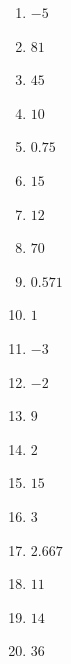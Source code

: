 \documentclass{article}
\begin{document}
\begin{enumerate}
\item $\displaystyle -5 $ \
\item $\displaystyle 81 $ \
\item $\displaystyle 45 $ \
\item $\displaystyle 10 $ \
\item $\displaystyle 0.75 $ \
\item $\displaystyle 15 $ \
\item $\displaystyle 12 $ \
\item $\displaystyle 70 $ \
\item $\displaystyle 0.571 $ \
\item $\displaystyle 1 $ \
\item $\displaystyle -3 $ \
\item $\displaystyle -2 $ \
\item $\displaystyle 9 $ \
\item $\displaystyle 2 $ \
\item $\displaystyle 15 $ \
\item $\displaystyle 3 $ \
\item $\displaystyle 2.667 $ \
\item $\displaystyle 11 $ \
\item $\displaystyle 14 $ \
\item $\displaystyle 36 $ \

\end{enumerate}
\end{document}
